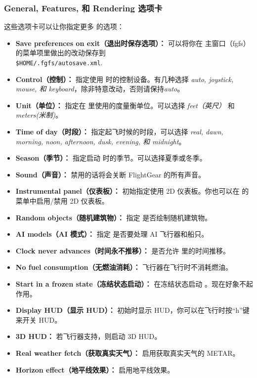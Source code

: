 \subsubsection{General, Features, 和 Rendering 选项卡}
这些选项卡可以让你指定更多 \FlightGear{} 的选项：
\begin{itemize}
\item \textbf{Save preferences on exit（退出时保存选项）：} 可以将你在 \FlightGear{} 主窗口（fgfs）的菜单项里做出的改动保存到 \\ \texttt{\$HOME/.fgfs/autosave.xml}.
\item \textbf{Control（控制）：} 指定使用 \FlightGear{} 时的控制设备。有几种选择 \textit{auto, joystick, mouse, 和 keyboard}，除非特意改动，否则请保持\textit{auto}。
\item \textbf{Unit（单位）：} 指定在 \FlightGear{} 里使用的度量衡单位。可以选择 \textit{feet（英尺）} 和 \textit{meters(米制)}。
\item \textbf{Time of day（时段）：} 指定起飞时候的时段，可以选择 \textit{real, dawn, morning, noon, afternoon, dusk, evening, 和 midnight}。
\item \textbf{Season（季节）：} 指定启动 \FlightGear{} 时的季节。可以选择夏季或冬季。
\item \textbf{Sound（声音）：} 禁用的话将会关断 FlightGear 的所有声音。
\item \textbf{Instrumental panel（仪表板）：} 初始指定使用 2D 仪表板。你也可以在 \FlightGear{} 的菜单中启用/禁用 2D 仪表板。
\item \textbf{Random objects（随机建筑物）：} 指定 \FlightGear{} 是否绘制随机建筑物。
\item \textbf{AI models（AI 模式）：} 指定 \FlightGear{} 是否要处理 AI 飞行器和船只。
\item \textbf{Clock never advances（时间永不推移）：} 是否允许 \FlightGear{} 里的时间推移。
\item \textbf{No fuel consumption（无燃油消耗）：} 飞行器在飞行时不消耗燃油。
\item \textbf{Start in a frozen state（冻结状态启动）：} 在冻结状态启动 \FlightGear{}。现在好象不起作用。
\item \textbf{Display HUD（显示 HUD）：} 初始时显示 HUD，你可以在飞行时按“h”键来开关 HUD。
\item \textbf{3D HUD：} 若飞行器支持，则启动 3D HUD。
\item \textbf{Real weather fetch（获取真实天气）：} 启用获取真实天气的 METAR。
\item \textbf{Horizon effect（地平线效果）：} 启用地平线效果。

\end{itemize}
